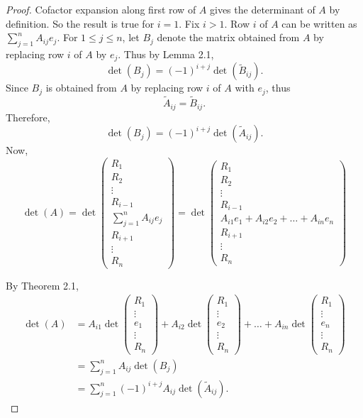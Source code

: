 \documentclass[12pt, a4paper]{article}
\theoremstyle{definition}
\theoremstyle{remark}
\begin{document}
    \begin{proof}
    Cofactor expansion along first row of $A$ gives the determinant of $A$ by definition. So the result is true for $i = 1$. Fix $i > 1$. Row $i$ of $A$ can be written as $\sum_{j=1}^{n} A_{ij} e_j$. For $1 \le j \le n$, let $B_j$ denote the matrix obtained from $A$ by replacing row $i$ of $A$ by $e_j$. Thus by Lemma 2.1,
    \[
    \det(B_j) = (-1)^{i+j} \det(\widetilde{B}_{ij}).
    \]
    Since $B_j$ is obtained from $A$ by replacing row $i$ of $A$ with $e_j$, thus
    \[
    \widetilde{A}_{ij} = \widetilde{B}_{ij}.
    \]
    Therefore,
    \[
    \det(B_j) = (-1)^{i+j} \det(\widetilde{A}_{ij}).
    \]
    Now,
    \[
    \det(A) = \det \begin{pmatrix}
    R_1 \\
    R_2 \\
    \vdots \\
    R_{i-1} \\
    \sum_{j=1}^{n} A_{ij} e_j \\
    R_{i+1} \\
    \vdots \\
    R_n
    \end{pmatrix}
    = \det \begin{pmatrix}
    R_1 \\
    R_2 \\
    \vdots \\
    R_{i-1} \\
    A_{i1}e_1 + A_{i2}e_2 + \dots + A_{in}e_n \\
    R_{i+1} \\
    \vdots \\
    R_n
    \end{pmatrix}
    \]

    By Theorem 2.1,
    \begin{align*}
    \det(A) &= A_{i1} \det \begin{pmatrix}
    R_1 \\
    \vdots \\
    e_1 \\
    \vdots \\
    R_n
    \end{pmatrix}
    + A_{i2} \det \begin{pmatrix}
    R_1 \\
    \vdots \\
    e_2 \\
    \vdots \\
    R_n
    \end{pmatrix}
    + \dots + A_{in} \det \begin{pmatrix}
    R_1 \\
    \vdots \\
    e_n \\
    \vdots \\
    R_n
    \end{pmatrix} \\
    &= \sum_{j=1}^{n} A_{ij} \det(B_j) \\
    &= \sum_{j=1}^{n} (-1)^{i+j} A_{ij} \det(\widetilde{A}_{ij}).
    \end{align*}
    \end{proof}
\end{document}
